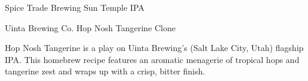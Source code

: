 \begin{recipie}{Spice Trade Brewing Sun Temple IPA}
\begin{ingredientsblock}

\end{ingredientsblock}

\end{recipie}

\begin{recipie}{Uinta Brewing Co. Hop Nosh Tangerine Clone}

\begin{aboutblock}
Hop Nosh Tangerine is a play on Uinta Brewing's (Salt Lake City, Utah) flagship
IPA. This homebrew recipe features an aromatic menagerie of tropical hops and
tangerine zest and wraps up with a crisp, bitter finish. \sourceaha
\end{aboutblock}


\begin{methodandtiming}
 
\begin{mashsteps}
\end{mashsteps}

\begin{fermentationsteps}
\end{fermentationsteps}

\end{methodandtiming}

\pagebreak

\begin{ingredientsblock}

\begin{malts}
\end{malts}

\begin{hops}
\end{hops}


\end{ingredientsblock}

\end{recipie}

